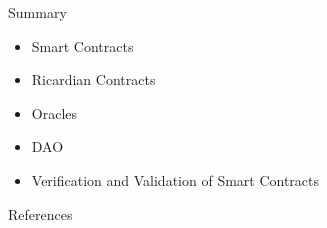 \documentclass[pdf,table]{beamer}
\begin{document}



\begin{frame}{Summary}
	\begin{itemize}
		\item Smart Contracts
		\item Ricardian Contracts
		\item Oracles
		\item DAO
		\item Verification and Validation of Smart Contracts
	\end{itemize}
\end{frame}

					
\begin{frame}[allowframebreaks]{References}
	\printbibliography
\end{frame}
	
\end{document}
